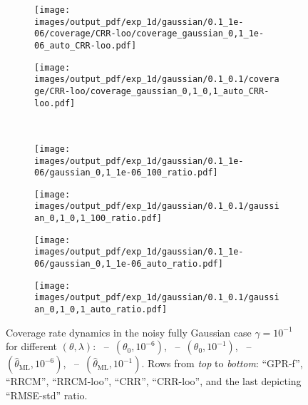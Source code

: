 \documentclass[a4paper,14pt]{extarticle}
\begin{document}
\begin{figure}
\begin{subfigure}[b]{0.25\linewidth}
  \end{subfigure}%
  \begin{subfigure}[b]{0.25\linewidth}
    \texttt{[image: images/output\_pdf/exp\_1d/gaussian/0.1\_1e-06/coverage/CRR-loo/coverage\_gaussian\_0,1\_1e-06\_auto\_CRR-loo.pdf]}
  \end{subfigure}%
  \begin{subfigure}[b]{0.25\linewidth}
    \texttt{[image: images/output\_pdf/exp\_1d/gaussian/0.1\_0.1/coverage/CRR-loo/coverage\_gaussian\_0,1\_0,1\_auto\_CRR-loo.pdf]}
  \end{subfigure}\\
  \begin{subfigure}[b]{0.25\linewidth}
    \texttt{[image: images/output\_pdf/exp\_1d/gaussian/0.1\_1e-06/gaussian\_0,1\_1e-06\_100\_ratio.pdf]}
    \caption{} \label{fig:gaussian_1d_high_noise_c1}
  \end{subfigure}%
  \begin{subfigure}[b]{0.25\linewidth}
    \texttt{[image: images/output\_pdf/exp\_1d/gaussian/0.1\_0.1/gaussian\_0,1\_0,1\_100\_ratio.pdf]}
    \caption{} \label{fig:gaussian_1d_high_noise_c2}
  \end{subfigure}%
  \begin{subfigure}[b]{0.25\linewidth}
    \texttt{[image: images/output\_pdf/exp\_1d/gaussian/0.1\_1e-06/gaussian\_0,1\_1e-06\_auto\_ratio.pdf]}
    \caption{} \label{fig:gaussian_1d_high_noise_c3}
  \end{subfigure}%
  \begin{subfigure}[b]{0.25\linewidth}
    \texttt{[image: images/output\_pdf/exp\_1d/gaussian/0.1\_0.1/gaussian\_0,1\_0,1\_auto\_ratio.pdf]}
    \caption{} \label{fig:gaussian_1d_high_noise_c4}
  \end{subfigure}%
  \caption{Coverage rate dynamics in the noisy fully Gaussian case $\gamma=10^{-1}$
  for different $(\theta, \lambda)$:
  ~--~$(\theta_0, 10^{-6})$,
  ~--~$(\theta_0, 10^{-1})$,
  ~--~$(\hat{\theta}_\text{ML}, 10^{-6})$,
  ~--~$(\hat{\theta}_\text{ML}, 10^{-1})$.
  Rows from \textit{top} to \textit{bottom}: ``GPR-f'', ``RRCM'', ``RRCM-loo'',
  ``CRR'', ``CRR-loo'', and the last depicting ``RMSE-std'' ratio.}
  \label{fig:gaussian_1d_high_noise}
\end{figure}
\end{document}
